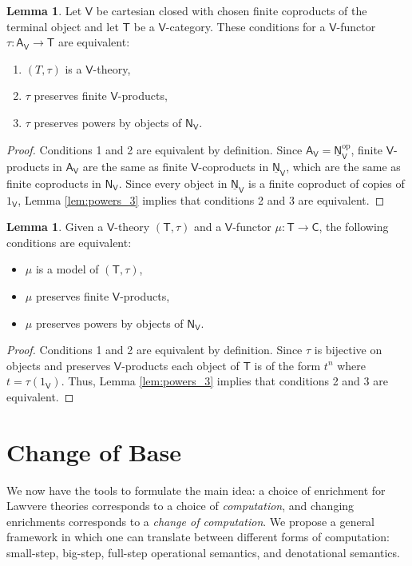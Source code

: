 \documentclass{amsart}
\theoremstyle{definition}
\newtheorem{lemma}[theorem]{Lemma}
\newcommand{\NN}{\mathsf{N}}
\newcommand{\A}{\mathsf{A}}
\newcommand{\V}{\mathsf{V}}
\newcommand{\C}{\mathsf{C}}
\newcommand{\T}{\mathsf{T}}
\newcommand{\op}{\mathrm{op}}
\newcommand{\maps}{\colon}
\begin{document}
\begin{lemma}
\label{lem:powers_4}
Let $\V$ be cartesian closed with chosen finite coproducts of the terminal object and let
$\T$ be a $\V$-category.  These conditions for a $\V$-functor $\tau \maps \A_\V \to \T$ are equivalent:
\begin{enumerate}
\item $(T,\tau)$ is a $\V$-theory,
\item $\tau$ preserves finite $\V$-products,
\item $\tau$ preserves powers by objects of $\NN_\V$.
\end{enumerate}
\end{lemma}

\begin{proof} Conditions 1 and 2 are equivalent by definition.
Since $\A_\V = \underline{\NN}_\V^\op$, finite $\V$-products in $\A_\V$ are 
the same as finite $\V$-coproducts in $\underline{\NN}_\V$, which are the same as 
finite coproducts in $\NN_\V$.   Since every object in $\underline{\NN}_\V$ is a 
finite coproduct of copies of $1_\V$, Lemma \ref{lem:powers_3} implies that conditions
2 and 3 are equivalent.
\end{proof}

\begin{lemma}
\label{lem:powers_5}
Given a $\V$-theory $(\T,\tau)$ and a $\V$-functor $\mu \maps \T \to \C$,
the following conditions are equivalent:
\begin{itemize}
\item $\mu$ is a model of $(\T,\tau)$,
\item $\mu$ preserves finite $\V$-products,
\item $\mu$ preserves powers by objects of $\NN_\V$.
\end{itemize}
\end{lemma}

\begin{proof}
Conditions 1 and 2 are equivalent by definition.   Since $\tau$ is bijective on 
objects and preserves $\V$-products each object of $\T$ is of the form $t^n$ 
where $t = \tau(1_\V)$.   Thus, Lemma \ref{lem:powers_3} implies that
conditions 2 and 3 are equivalent.
\end{proof}

\section{Change of Base}
\label{sec:base_change}

We now have the tools to formulate the main idea: a choice of enrichment for Lawvere theories corresponds to a choice of \textit{computation}, and changing enrichments corresponds to a \textit{change of computation}. We propose a general framework in which one can translate between different forms of computation: small-step, big-step, full-step operational semantics, and denotational semantics.
\end{document}
